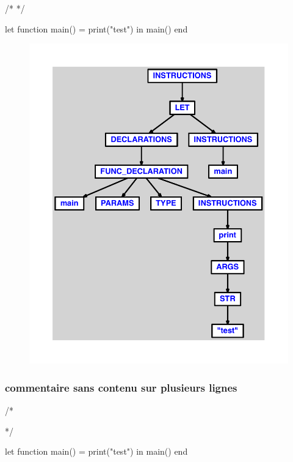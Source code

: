 \documentclass{article}
\begin{document}
\begin{verbatimtab}
/* */

let
	function main() = print("test")
in main() end
\end{verbatimtab}
\begin{figure}[H]\centering\includegraphics[max width=\textwidth]{ast/ast_162.pdf}\end{figure}\subsubsection{commentaire sans contenu sur plusieurs lignes}
\begin{verbatimtab}
/*



*/

let
	function main() = print("test")
in main() end
\end{verbatimtab}
\end{document}
